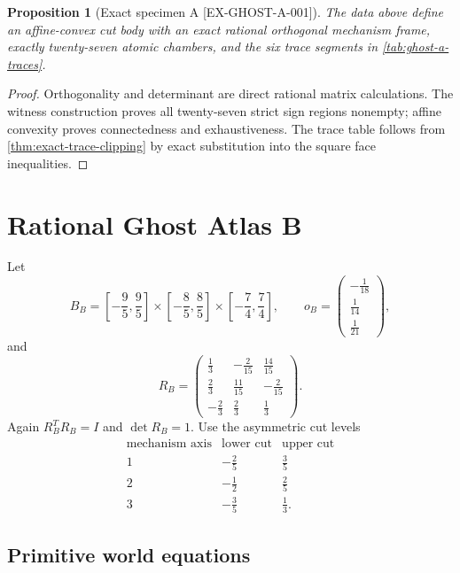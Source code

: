 \documentclass[11pt,openany]{book}
\newcommand{\claimid}[1]{\textnormal{\sffamily\footnotesize[#1]}}
\theoremstyle{polyplain}
\newtheorem{proposition}[theorem]{Proposition}
\theoremstyle{polydef}
\begin{document}
\begin{proposition}[Exact specimen A \claimid{EX-GHOST-A-001}]
The data above define an affine-convex cut body with an exact rational orthogonal mechanism frame, exactly twenty-seven atomic chambers, and the six trace segments in \cref{tab:ghost-a-traces}.
\end{proposition}

\begin{proof}
Orthogonality and determinant are direct rational matrix calculations. The witness construction proves all twenty-seven strict sign regions nonempty; affine convexity proves connectedness and exhaustiveness. The trace table follows from \cref{thm:exact-trace-clipping} by exact substitution into the square face inequalities.
\end{proof}

\section{Rational Ghost Atlas B}
\label{sec:rational-ghost-b}

Let
\[
B_B=
\left[-\frac95,\frac95\right]
\times\left[-\frac85,\frac85\right]
\times\left[-\frac74,\frac74\right],
\qquad
o_B=
\begin{pmatrix}-\frac1{18}\\\frac1{14}\\\frac1{21}\end{pmatrix},
\]
and
\[
R_B=
\begin{pmatrix}
\frac13&-\frac2{15}&\frac{14}{15}\\
\frac23&\frac{11}{15}&-\frac2{15}\\
-\frac23&\frac23&\frac13
\end{pmatrix}.
\]
Again $R_B^TR_B=I$ and $\det R_B=1$. Use the asymmetric cut levels
\[
\begin{array}{c|cc}
\text{mechanism axis}&\text{lower cut}&\text{upper cut}\\\hline
1&-\frac25&\frac35\\
2&-\frac12&\frac25\\
3&-\frac35&\frac13.
\end{array}
\]

\subsection{Primitive world equations}
\end{document}
